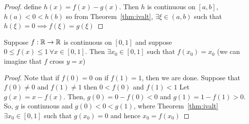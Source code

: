 \begin{proof}
    define $h(x) = f(x) - g(x)$. Then $h$ is continuous on $\left[a, b\right]$,
    $h(a) < 0 < h(b)$ so from Theorem~\ref{thm:ivalt}, $\exists \xi \in (a, b)$ such that
    $h(\xi) = 0 \implies f(\xi)=g(\xi)$
\end{proof}

\begin{example}
    Suppose $f: \mathbb R \to \mathbb R$ is continuous on $\left[0, 1\right]$ and suppose 
    $0 \leq f(x) \leq 1\ \forall x \in \left[0, 1\right]$. Then $\exists x_0 \in \left[0, 1\right]$ 
    such that $f(x_0) = x_0$ (we can imagine that $f$ cross $y = x$)
\end{example}

\begin{proof}
    Note that if $f(0) = 0$ on if $f(1) = 1$, then we are done.
    Suppose that $f(0) \neq 0$ and $f(1) \neq 1$ then $0 < f(0)$ and $f(1) < 1$
    Let $g(x) = x - f(x)$. Then, $g(0) = 0 - f(0) < 0$ and $g(1) = 1 - f(1) > 0$.
    So, $g$ is continuous and $g(0) < 0 < g(1)$, where Theorem~\ref{thm:ivalt} 
    $\exists x_0 \in \left[0, 1\right]$ such that $g(x_0) = 0$ and hence $x_0 =f(x_0)$
\end{proof}
